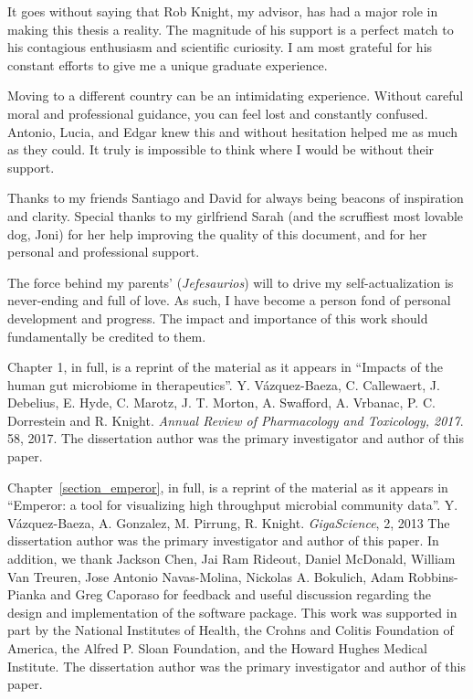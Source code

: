 \begin{frontmatter}
\begin{acknowledgements}
    It goes without saying that Rob Knight, my advisor, has had a major role in 
    making this thesis a reality. The magnitude of his support is a perfect 
    match to his contagious enthusiasm and scientific curiosity. I am most 
    grateful for his constant efforts to give me a unique graduate experience.

    Moving to a different country can be an intimidating experience. Without 
    careful moral and professional guidance, you can feel lost and constantly 
    confused. Antonio, Lucia, and Edgar knew this and without hesitation helped 
    me as much as they could. It truly is impossible to think where I would be 
    without their support.

    Thanks to my friends Santiago and David for always being beacons of 
    inspiration and clarity. Special thanks to my girlfriend Sarah (and the 
    scruffiest most lovable dog, Joni) for her help improving the quality of 
    this document, and for her personal and professional support.

    The force behind my parents' (\textit{Jefesaurios}) will to drive my 
    self-actualization is never-ending and full of love. As such, I have become 
    a person fond of personal development and progress. The impact and 
    importance of this work should fundamentally be credited to them.

    Chapter 1, in full, is a reprint of the material as it appears in ``Impacts 
    of the human gut microbiome in therapeutics''. Y.  V\'azquez-Baeza, C.  
    Callewaert, J. Debelius, E. Hyde, C.  Marotz, J. T.  Morton, A. Swafford, 
    A. Vrbanac, P. C.  Dorrestein and R.  Knight.  \emph{Annual Review of 
    Pharmacology and Toxicology, 2017}. 58, 2017. The dissertation author was 
    the primary investigator and author of this paper.

    Chapter~\ref{section_emperor}, in full, is a reprint of the material as it 
    appears in ``Emperor: a tool for visualizing high throughput microbial 
    community data''. Y. V\'azquez-Baeza, A. Gonzalez, M. Pirrung, R.  Knight.  
    \emph{GigaScience}, 2, 2013 The dissertation author was the primary 
    investigator and author of this paper. In addition, we thank Jackson Chen, 
    Jai Ram Rideout, Daniel McDonald, William Van Treuren, Jose Antonio 
    Navas\hyp{}Molina, Nickolas A. Bokulich, Adam Robbins\hyp{}Pianka and Greg 
    Caporaso for feedback and useful discussion regarding the design and 
    implementation of the software package. This work was supported in part by 
    the National Institutes of Health, the Crohns and Colitis Foundation of 
    America, the Alfred P. Sloan Foundation, and the Howard Hughes Medical 
    Institute. The dissertation author was the primary investigator and 
    author of this paper.


\end{acknowledgements}
\end{frontmatter}
